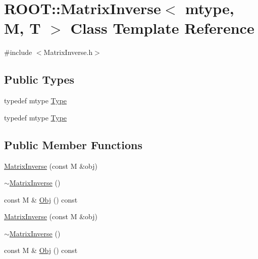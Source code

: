 \hypertarget{classROOT_1_1Minuit2_1_1MatrixInverse}{}\section{R\+O\+OT\+:\+:Matrix\+Inverse$<$ mtype, M, T $>$ Class Template Reference}
\label{classROOT_1_1Minuit2_1_1MatrixInverse}


{\ttfamily \#include $<$Matrix\+Inverse.\+h$>$}

\subsection*{Public Types}
\begin{DoxyCompactItemize}
\item 
typedef mtype \mbox{\hyperlink{classROOT_1_1Minuit2_1_1MatrixInverse_a71e683647f8cff3b0912eee539f039de}{Type}}
\item 
typedef mtype \mbox{\hyperlink{classROOT_1_1Minuit2_1_1MatrixInverse_a71e683647f8cff3b0912eee539f039de}{Type}}
\end{DoxyCompactItemize}
\subsection*{Public Member Functions}
\begin{DoxyCompactItemize}
\item 
\mbox{\hyperlink{classROOT_1_1Minuit2_1_1MatrixInverse_a9baeca2e3357247472bd6c1a802f9549}{Matrix\+Inverse}} (const M \&obj)
\item 
\mbox{\hyperlink{classROOT_1_1Minuit2_1_1MatrixInverse_a190e28b4816e8bbce3fdd4b2122e89b4}{$\sim$\+Matrix\+Inverse}} ()
\item 
const M \& \mbox{\hyperlink{classROOT_1_1Minuit2_1_1MatrixInverse_a189a8ae3c36a989a47758de7aee4e181}{Obj}} () const
\item 
\mbox{\hyperlink{classROOT_1_1Minuit2_1_1MatrixInverse_a9baeca2e3357247472bd6c1a802f9549}{Matrix\+Inverse}} (const M \&obj)
\item 
\mbox{\hyperlink{classROOT_1_1Minuit2_1_1MatrixInverse_a190e28b4816e8bbce3fdd4b2122e89b4}{$\sim$\+Matrix\+Inverse}} ()
\item 
const M \& \mbox{\hyperlink{classROOT_1_1Minuit2_1_1MatrixInverse_a189a8ae3c36a989a47758de7aee4e181}{Obj}} () const
\end{DoxyCompactItemize}


